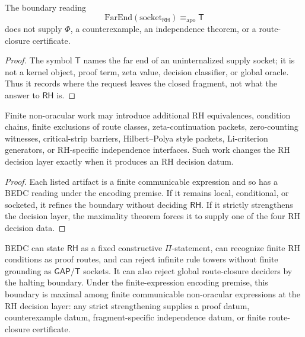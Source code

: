 \begin{corollary}
\label{cor:rh-t-does-not-decide}
The boundary reading
$$
\mathrm{FarEnd}(\mathrm{socket}_{\mathsf{RH}})
\equiv_{\mathrm{apo}} \mathsf{T}
$$
does not supply $\Phi$, a counterexample, an independence theorem, or a
route-closure certificate.
\end{corollary}

\begin{proof}
The symbol $\mathsf{T}$ names the far end of an uninternalized supply
socket; it is not a kernel object, proof term, zeta value, decision
classifier, or global oracle.  Thus it records where the request leaves the
closed fragment, not what the answer to $\mathsf{RH}$ is.
\end{proof}

\begin{corollary}
\label{cor:rh-local-work-admissible}
Finite non-oracular work may introduce additional RH equivalences,
condition chains, finite exclusions of route classes, zeta-continuation
packets, zero-counting witnesses, critical-strip barriers, Hilbert--Polya
style packets, Li-criterion generators, or RH-specific independence
interfaces.  Such work changes the RH decision layer exactly when it
produces an RH decision datum.
\end{corollary}

\begin{proof}
Each listed artifact is a finite communicable expression and so has a BEDC
reading under the encoding premise.  If it remains local, conditional, or
socketed, it refines the boundary without deciding $\mathsf{RH}$.  If it
strictly strengthens the decision layer, the maximality theorem forces it
to supply one of the four RH decision data.
\end{proof}

\begin{corollary}
\label{cor:rh-route-boundary-summary}
BEDC can state $\mathsf{RH}$ as a fixed constructive $\Pi$-statement, can
recognize finite RH conditions as proof routes, and can reject infinite
rule towers without finite grounding as $\mathsf{GAP}/\mathsf{T}$ sockets.
It can also reject global route-closure deciders by the halting boundary.
Under the finite-expression encoding premise, this boundary is maximal
among finite communicable non-oracular expressions at the RH decision layer:
any strict strengthening supplies a proof datum, counterexample datum,
fragment-specific independence datum, or finite route-closure certificate.
\end{corollary}

